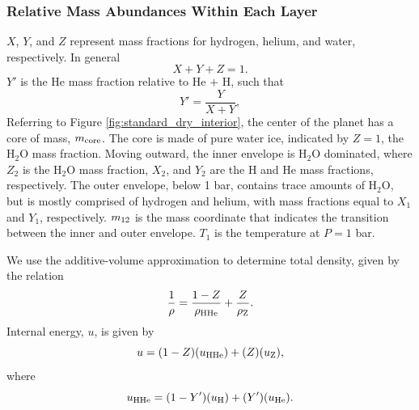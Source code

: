 \documentclass[11pt]{ucscthesisbs}
\begin{document}
\subsubsection{Relative Mass Abundances Within Each Layer}
$X$, $Y$, and $Z$ represent mass fractions for hydrogen, helium, and water, respectively. In general
\begin{equation}
  X + Y + Z = 1 .
\end{equation}
$Y'$ is the He mass fraction relative to He $+$ H, such that
\begin{equation}
  Y' = \frac{Y}{X+Y},
\end{equation}
Referring to Figure \ref{fig:standard_dry_interior}, the center of the planet has a core of mass, $m_{\rm core}$. The core is made of pure water ice, indicated by $Z = 1$, the H$_{2}$O mass fraction. Moving outward, the inner envelope is H$_{2}$O dominated, where $Z_{2}$ is the H$_{2}$O mass fraction, $X_{2}$, and $Y_{2}$ are the H and He mass fractions, respectively. The outer envelope, below 1 bar, contains trace amounts of H$_{2}$O, but is mostly comprised of hydrogen and helium, with mass fractions equal to $X_{1}$ and $Y_{1}$, respectively. $m_{\rm 12}$ is the mass coordinate that indicates the transition between the inner and outer envelope. $T_{1}$ is the temperature at $P=1$ bar. 

We use the additive-volume approximation to determine total density, given by the relation
\begin{equation}
  \frac{1}{\rho} = \frac{1-Z}{\rho_{\rm H He}} + \frac{Z}{\rho_{\rm Z}}.
\end{equation}
Internal energy, $u$, is given by
\begin{equation}
  u = (1-Z)(u_{\rm HHe}) + (Z) (u_{\rm Z}),
\end{equation}
where
\begin{equation}
 u_{\rm HHe} = (1-Y')(u_{\rm H}) + (Y')(u_{\rm He}).
\end{equation}
\end{document}
